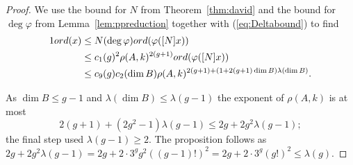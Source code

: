 \documentclass[12pt,oneside]{amsart}
\numberwithin{maincounter}{section}
\numberwithin{equation}{section}
\newcommand{\ord}[1]{{\rm ord}({#1})}
\begin{document}
\begin{proof}
  We use the bound for $N$ from Theorem~\ref{thm:david} and the bound for
  $\deg\varphi$ from Lemma~\ref{lem:ppreduction} together with
  (\ref{eq:Deltabound}) to find
  \begin{alignat*}1
    \ord{x} &\le 
    N(\deg\varphi)
    \ord{\varphi([N]x)} \\
    &\le c_1(g)^2 \rho(A,k)^{2(g+1)}
    \ord{\varphi([N]x)}
    \\
    &\le c_{9}(g) c_2(\dim B) \rho(A,k)^{2(g+1)+(1+2(g+1)\dim B)\lambda(\dim
      B)}.
  \end{alignat*}

  As $\dim B\le g-1$ and $\lambda(\dim B)\le \lambda(g-1)$
the exponent of $\rho(A,k)$ is at most
  \begin{equation*}
    2(g+1)+(2g^2-1)\lambda(g-1)\le 2g +2g^2\lambda(g-1);
  \end{equation*}
  the final step used $\lambda(g-1)\ge 2$. The proposition follows as
  $2g+2g^2\lambda(g-1) = 2g+2 \cdot 3^g g^2((g-1)!)^2=2g+2\cdot 3^g
  (g!)^2 \le \lambda(g)$.
%
%
\end{proof}
\end{document}
